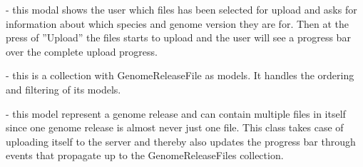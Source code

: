  - this modal shows the user which files has been selected for upload and asks for information about which species and genome version they are for. Then at the press of ''Upload'' the files starts to upload and the user will see a progress bar over the complete upload progress. 

 - this is a collection with GenomeReleaseFile as models. It handles the ordering and filtering of its models. 

 - this model represent a genome release and can contain multiple files in itself since one genome release is almost never just one file. This class takes case of uploading itself to the server and thereby also updates the progress bar through events that propagate up to the GenomeReleaseFiles collection. 
